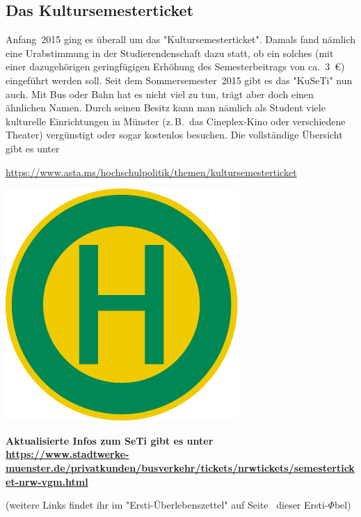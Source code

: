 \begin{multicols*}{2}
\subsection{Das Kultursemesterticket}
Anfang~2015 ging es überall um das "Kultursemesterticket".
Damals fand nämlich eine Urabstimmung in der Studierendenschaft dazu statt, ob ein solches (mit einer dazugehörigen geringfügigen Erhöhung des Semesterbeitrags von ca.\ \SI{3}{\euro}) eingeführt werden soll.
Seit dem Sommersemester~2015 gibt es das "KuSeTi" nun auch.
Mit Bus oder Bahn hat es nicht viel zu tun, trägt aber doch einen ähnlichen Namen.
Durch seinen Besitz kann man nämlich als Student viele kulturelle Einrichtungen in Münster (z.\,B.\ das Cineplex-Kino oder verschiedene Theater) vergünstigt oder sogar kostenlos besuchen.
Die vollständige Übersicht gibt es unter
\vspace{-1ex}
\begin{center}
	\url{https://www.asta.ms/hochschulpolitik/themen/kultursemesterticket}
\end{center}

\smallskip

\begin{center}
	\includegraphics[width=\columnwidth, height=0.14\textheight]{res/bushaltestelle.pdf}

	{\bfseries
	Aktualisierte Infos zum SeTi gibt es unter\\
	\url{https://www.stadtwerke-muenster.de/privatkunden/busverkehr/tickets/nrwtickets/semesterticket-nrw-vgm.html}}
	
	(weitere Links findet ihr im "Ersti-Überlebenszettel" auf Seite~\pageref{dpü} dieser Ersti-$\Phi$bel)
\end{center}

\end{multicols*}
